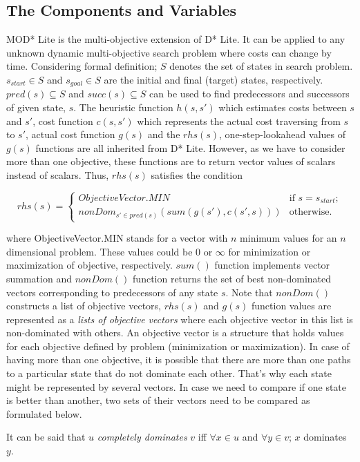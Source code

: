 \subsection{The Components and Variables}
MOD* Lite is the multi-objective extension of D* Lite. It can be applied to any unknown dynamic multi-objective search problem where costs can change by time. Considering formal definition; $S$ denotes the set of states in search problem. $s_{start} \in S$ and $s_{goal} \in S$ are the initial and final (target) states, respectively. $pred(s) \subseteq S$ and $succ(s) \subseteq S$ can be used to find predecessors and successors of given state, $s$. The heuristic function $h(s, s')$ which estimates costs between $s$ and $s'$, cost function $c(s, s')$ which represents the actual cost traversing from $s$ to $s'$, actual cost function $g(s)$ and the $rhs(s)$, one-step-lookahead values of $g(s)$ functions are all inherited from D* Lite. However, as we have to consider more than one objective, these functions are to return vector values of scalars instead of scalars. Thus, $rhs(s)$ satisfies the condition

\[ rhs(s) = \left\{ \begin{array}{cc}
ObjectiveVector.MIN & \mbox{if $s=s_{start}$};\\
nonDom_{s' \in pred(s)}(sum(g(s'), c(s', s))) & \mbox{otherwise}.\end{array} \right. \] 

where ObjectiveVector.MIN stands for a vector with $n$ minimum values for an $n$ dimensional problem. These values could be $0$ or $\infty$ for minimization or maximization of objective, respectively. $sum()$ function implements vector summation and $nonDom()$ function returns the set of best non-dominated vectors corresponding to predecessors of any state $s$. Note that $nonDom()$ constructs a list of objective vectors, $rhs(s)$ and $g(s)$ function values are represented as a \textit{lists of objective vectors} where each objective vector in this list is non-dominated with others. An objective vector is a structure that holds values for each objective defined by problem (minimization or maximization). In case of having more than one objective, it is possible that there are more than one paths to a particular state that do not dominate each other. That's why each state might be represented by several vectors. In case we need to compare if one state is better than another, two sets of their vectors need to be compared as formulated below.

\begin{definition}
It can be said that $u$ \textit{completely dominates} $v$ iff $\forall x\in u$ and $\forall y\in v$; $x$ dominates $y$.
\end{definition}

